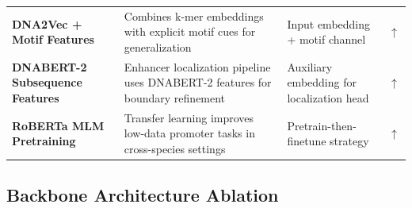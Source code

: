 \documentclass[11pt,a4paper]{article}
\begin{document}
\begin{longtable}{L{3.0cm}L{4.3cm}L{4.2cm}C{1.4cm}}
\textbf{DNA2Vec + Motif Features} & Combines k-mer embeddings with explicit motif cues for generalization~\cite{enhancermdlf} & Input embedding + motif channel & \textcolor{positive}{$\uparrow$} \\

\textbf{DNABERT-2 Subsequence Features} & Enhancer localization pipeline uses DNABERT-2 features for boundary refinement~\cite{hienhancer} & Auxiliary embedding for localization head & \textcolor{positive}{$\uparrow$} \\

\textbf{RoBERTa MLM Pretraining} & Transfer learning improves low-data promoter tasks in cross-species settings~\cite{tokenization_promoter} & Pretrain-then-finetune strategy & \textcolor{positive}{$\uparrow$} \\

\end{longtable}

\subsection{Backbone Architecture Ablation}
\end{document}
